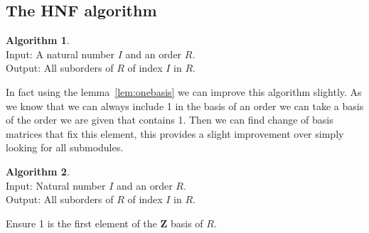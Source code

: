 \documentclass[12pt,a4paper,abstracton,bibtotoc]{scrreprt}
\theoremstyle{definition}
\newtheorem{alg}{Algorithm}
\newcommand{\ZZ}{\mathbf{Z}}
\begin{document}
\subsection{The HNF algorithm}
\begin{alg}~\\
Input: A natural number $I$ and an order $R$.\\
Output: All suborders of $R$ of index $I$ in $R$.\\
\begin{algorithm}[H]
\end{algorithm}
\end{alg}

In fact using the lemma~\ref{lem:onebasis} we can improve this algorithm slightly.
As we know that we can always include 1 in the basis of an order we can take a basis of the order we are given that contains 1.
Then we can find change of basis matrices that fix this element, this provides a slight improvement over simply looking for all submodules.

\begin{alg}~\\
Input: Natural number $I$ and an order $R$.\\
Output: All suborders of $R$ of index $I$ in $R$.\\
\begin{algorithm}[H]
Ensure 1 is the first element of the $\ZZ$ basis of $R$.\\
\end{algorithm}
\end{alg}
\end{document}
